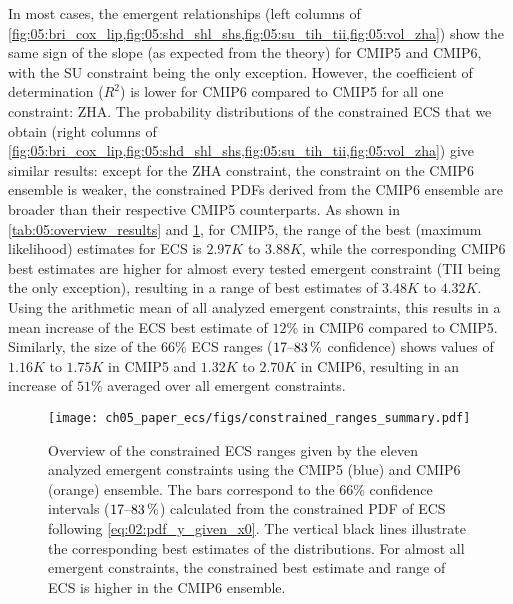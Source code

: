 In most cases, the emergent relationships (left columns of
\cref{fig:05:bri_cox_lip,fig:05:shd_shl_shs,fig:05:su_tih_tii,fig:05:vol_zha})
show the same sign of the slope (as expected from the theory) for \acs{CMIP}5
and \acs{CMIP}6, with the SU constraint being the only exception. However, the
coefficient of determination ($R^2$) is lower for \acs{CMIP}6 compared to
\acs{CMIP}5 for all one constraint: ZHA. The probability distributions of the
constrained \ac{ECS} that we obtain (right columns of
\cref{fig:05:bri_cox_lip,fig:05:shd_shl_shs,fig:05:su_tih_tii,fig:05:vol_zha})
give similar results: except for the ZHA constraint, the constraint on the
\acs{CMIP}6 ensemble is weaker, \ie{} the constrained \acp{PDF} derived from
the \acs{CMIP}6 ensemble are broader than their respective \acs{CMIP}5
counterparts. As shown in \cref{tab:05:overview_results} and
\cref{fig:05:overview_results}, for \acs{CMIP}5, the range of the best (maximum
likelihood) estimates for \acs{ECS} is $2.97 \unit{K}$ to $3.88 \unit{K}$,
while the corresponding \acs{CMIP}6 best estimates are higher for almost every
tested emergent constraint (TII being the only exception), resulting in a range
of best estimates of $3.48 \unit{K}$ to $4.32 \unit{K}$. Using the arithmetic
mean of all analyzed emergent constraints, this results in a mean increase of
the \ac{ECS} best estimate of $12 \unit{\%}$ in \acs{CMIP}6 compared to
\acs{CMIP}5. Similarly, the size of the $66 \unit{\%}$ \ac{ECS} ranges
($\rangeunit{17}{83}{\%}$ confidence) shows values of $1.16 \unit{K}$ to $1.75
\unit{K}$ in \acs{CMIP}5 and $1.32 \unit{K}$ to $2.70 \unit{K}$ in \acs{CMIP}6,
resulting in an increase of $51 \unit{\%}$ averaged over all emergent
constraints.

\begin{figure}[t]
  \centering
  \texttt{[image: 
    ch05\_paper\_ecs/figs/constrained\_ranges\_summary.pdf]}
  \caption[
    Overview of the constrained \acf{ECS} ranges given by the eleven emergent
    constraints using the \acs{CMIP}5 and \acs{CMIP}6 ensemble.
  ]{
    Overview of the constrained \acf{ECS} ranges given by the eleven analyzed
    emergent constraints using the \acs{CMIP}5 (blue) and \acs{CMIP}6 (orange)
    ensemble. The bars correspond to the $66 \unit{\%}$ confidence intervals
    ($\rangeunit{17}{83}{\%}$) calculated from the constrained \acl{PDF} of
    \acs{ECS} following \cref{eq:02:pdf_y_given_x0}. The vertical black lines
    illustrate the corresponding best estimates of the distributions. For
    almost all emergent constraints, the constrained best estimate and range of
    \acs{ECS} is higher in the \acs{CMIP}6 ensemble.
  }
  \label{fig:05:overview_results}
\end{figure}

